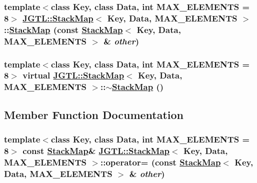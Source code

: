 \hypertarget{class_j_g_t_l_1_1_stack_map_a51a9f733e87c5da70660b73e8cf9651}{
\subsubsection[StackMap]{\setlength{\rightskip}{0pt plus 5cm}template$<$class Key, class Data, int MAX\_\-ELEMENTS = 8$>$ \hyperlink{class_j_g_t_l_1_1_stack_map}{JGTL::Stack\-Map}$<$ Key, Data, MAX\_\-ELEMENTS $>$::\hyperlink{class_j_g_t_l_1_1_stack_map}{Stack\-Map} (const \hyperlink{class_j_g_t_l_1_1_stack_map}{Stack\-Map}$<$ Key, Data, MAX\_\-ELEMENTS $>$ \& {\em other})}}
\label{class_j_g_t_l_1_1_stack_map_a51a9f733e87c5da70660b73e8cf9651}


\hypertarget{class_j_g_t_l_1_1_stack_map_e1648b2a04c3b9d57cb2377bcc8f94a8}{
\subsubsection[$\sim$StackMap]{\setlength{\rightskip}{0pt plus 5cm}template$<$class Key, class Data, int MAX\_\-ELEMENTS = 8$>$ virtual \hyperlink{class_j_g_t_l_1_1_stack_map}{JGTL::Stack\-Map}$<$ Key, Data, MAX\_\-ELEMENTS $>$::$\sim$\hyperlink{class_j_g_t_l_1_1_stack_map}{Stack\-Map} ()}}
\label{class_j_g_t_l_1_1_stack_map_e1648b2a04c3b9d57cb2377bcc8f94a8}




\subsection{Member Function Documentation}
\hypertarget{class_j_g_t_l_1_1_stack_map_5e2b185fcda84ac8a692bd57159d97e9}{
\subsubsection[operator=]{\setlength{\rightskip}{0pt plus 5cm}template$<$class Key, class Data, int MAX\_\-ELEMENTS = 8$>$ const \hyperlink{class_j_g_t_l_1_1_stack_map}{Stack\-Map}\& \hyperlink{class_j_g_t_l_1_1_stack_map}{JGTL::Stack\-Map}$<$ Key, Data, MAX\_\-ELEMENTS $>$::operator= (const \hyperlink{class_j_g_t_l_1_1_stack_map}{Stack\-Map}$<$ Key, Data, MAX\_\-ELEMENTS $>$ \& {\em other})}}
\label{class_j_g_t_l_1_1_stack_map_5e2b185fcda84ac8a692bd57159d97e9}


